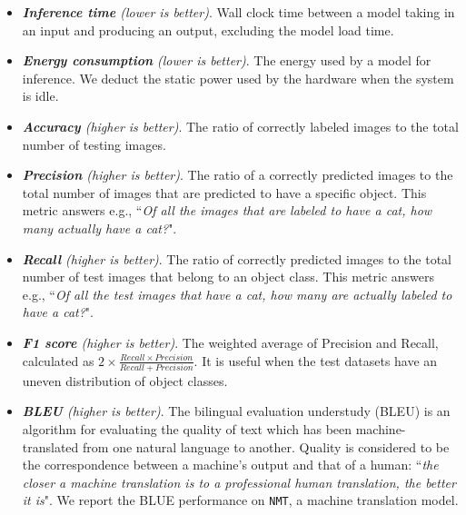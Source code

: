 \begin{itemize}
\item \emph{\textbf{Inference time} (lower is better)}. Wall clock time between a model taking in an input and producing an output,
    excluding the model load time.

\item \emph{\textbf{Energy consumption} (lower is better)}. The energy used by a model for inference.  We deduct the static power used by
    the hardware when the system is idle.

\item \emph{\textbf{Accuracy} (higher is better)}. The ratio of correctly labeled images to the total number of testing images.

\item \emph{\textbf{Precision} (higher is better)}. The ratio of a correctly predicted images to the total number of images that are
    predicted to have a specific object. This metric answers e.g., ``\emph{Of all the images that are labeled to have a cat, how many
    actually have a cat?}".

\item \emph{\textbf{Recall} (higher is better)}. The ratio of correctly predicted images to the total number of test images that belong
    to an object class. This metric answers e.g., ``\emph{Of all the test images that have a cat, how many are actually labeled to have a
    cat?}".

\item \emph{\textbf{F1 score} (higher is better)}.  The weighted average of Precision and Recall, calculated as $2\times\frac{Recall
    \times Precision} {Recall + Precision}$. It is useful when the test datasets have an uneven distribution of object classes.

\item \emph{\textbf{BLEU} (higher is better)}. The bilingual evaluation understudy (BLEU) is an algorithm for evaluating the quality of
    text which has been machine-translated from one natural language to another. Quality is considered to be the correspondence between a
    machine's output and that of a human: ``\emph{the closer a machine translation is to a professional human translation, the better it
    is}". We report the BLUE performance on \texttt{NMT}, a machine translation model.


\end{itemize}

